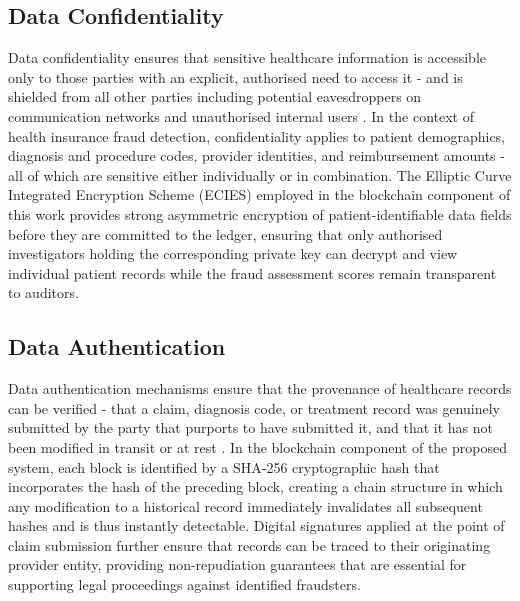 \subsection{Data Confidentiality}

Data confidentiality ensures that sensitive healthcare information is accessible only to those parties with an explicit, authorised need to access it - and is shielded from all other parties including potential eavesdroppers on communication networks and unauthorised internal users \cite{elemam2013}. In the context of health insurance fraud detection, confidentiality applies to patient demographics, diagnosis and procedure codes, provider identities, and reimbursement amounts - all of which are sensitive either individually or in combination. The Elliptic Curve Integrated Encryption Scheme (ECIES) employed in the blockchain component of this work provides strong asymmetric encryption of patient-identifiable data fields before they are committed to the ledger, ensuring that only authorised investigators holding the corresponding private key can decrypt and view individual patient records while the fraud assessment scores remain transparent to auditors.

\subsection{Data Authentication}

Data authentication mechanisms ensure that the provenance of healthcare records can be verified - that a claim, diagnosis code, or treatment record was genuinely submitted by the party that purports to have submitted it, and that it has not been modified in transit or at rest \cite{hassan2019}. In the blockchain component of the proposed system, each block is identified by a SHA-256 cryptographic hash that incorporates the hash of the preceding block, creating a chain structure in which any modification to a historical record immediately invalidates all subsequent hashes and is thus instantly detectable. Digital signatures applied at the point of claim submission further ensure that records can be traced to their originating provider entity, providing non-repudiation guarantees that are essential for supporting legal proceedings against identified fraudsters.

